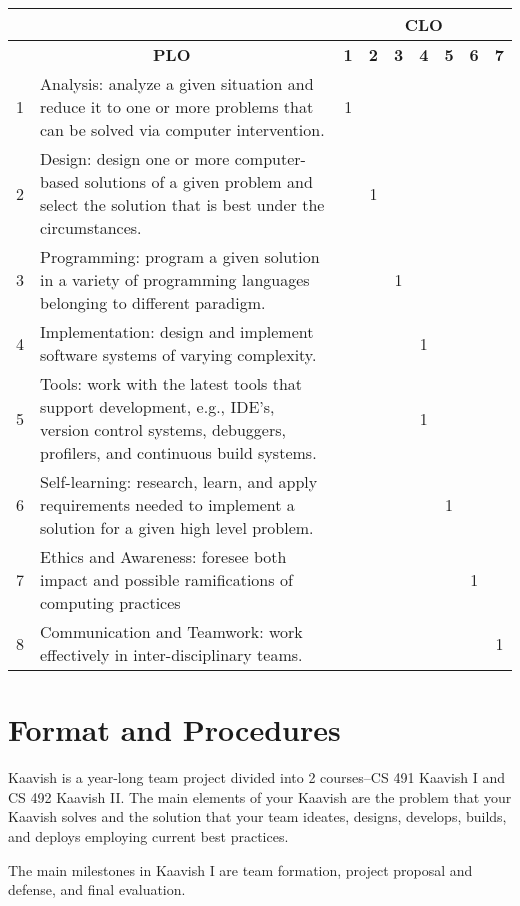 \documentclass[a4paper]{article}
\newcommand{\new}[1]{{#1}}
\begin{document}
\noindent\small
\begin{tabularx}{\linewidth}{|l|X||*{7}{c|}}
  \cline{3-9}
  \multicolumn{2}{c}{} & \multicolumn{7}{|c|}{\textbf{CLO}} \\\hline
  \multicolumn{2}{|c||}{\textbf{PLO}} & \textbf{1} & \textbf{2} & \textbf{3} & \textbf{4} & \textbf{5} & \textbf{6} & \textbf{7} \\\hline
 1 & Analysis: analyze a given situation and reduce it to one or more problems that can be solved via computer intervention. & 1 &&&&&&\\\hline
2 & Design: design one or more computer-based solutions of a given problem and select the solution that is best under the circumstances. &&1&&&&& \\\hline
 3 & Programming: program a given solution in a variety of programming languages belonging to different paradigm. &&&1&&&& \\\hline
 4 & Implementation: design and implement software systems of varying complexity. &&&&1&&& \\\hline
 5 & Tools: work with the latest tools that support development, e.g., IDE's, version control systems, debuggers, profilers, and continuous build systems. &&&&1&&& \\\hline
 6 & Self-learning: research, learn, and apply requirements needed to implement a solution for a given high level problem. &&&&&1&& \\\hline
 7 & Ethics and Awareness: foresee both impact and possible ramifications of computing practices &&&&&&1& \\\hline
 8 & Communication and Teamwork: work effectively in inter-disciplinary teams. &  &  &  &  &  & &1\\\hline
\end{tabularx}
\normalsize

\section{Format and Procedures}
\label{sec:format}

\new{Kaavish is a year-long team project divided into 2 courses--CS 491 Kaavish I and CS 492 Kaavish II. The main elements of your Kaavish are the problem that your Kaavish solves and the solution that your team ideates, designs, develops, builds, and deploys employing current best practices.}

\new{The main milestones in Kaavish I are team formation, project proposal and defense, and final evaluation.}
\end{document}
